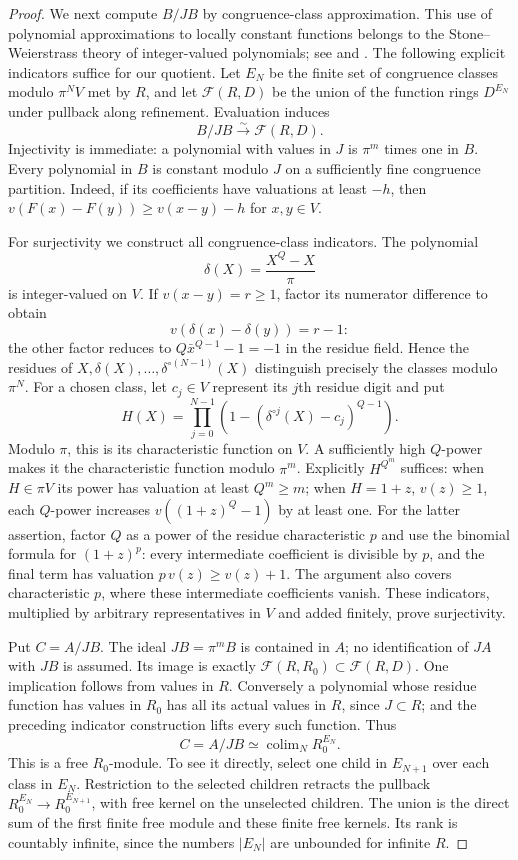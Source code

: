 \documentclass[11pt,a4paper]{article}
\theoremstyle{definition}
\begin{document}
\begin{proof}
We next compute $B/JB$ by congruence-class approximation. This
use of polynomial approximations to locally constant functions
belongs to the Stone--Weierstrass theory of integer-valued
polynomials; see \cite[\S4, pp.~52--53]{CahenGrazziniHaouat1982}
and \cite[Proposition~4.3, author version pp.~18--19]{CahenChabert1999Skolem}.
The following explicit indicators suffice for our quotient.
Let $E_N$ be the finite set of
congruence classes modulo $\pi^NV$ met by $R$, and let
$\mathcal F(R,D)$ be the union of the function rings $D^{E_N}$
under pullback along refinement. Evaluation induces
\[
 B/JB\xrightarrow{\sim}\mathcal F(R,D).
\]
Injectivity is immediate: a polynomial with values in $J$ is
$\pi^m$ times one in $B$. Every polynomial in $B$ is constant
modulo $J$ on a sufficiently fine congruence partition. Indeed,
if its coefficients have valuations at least $-h$, then
$v(F(x)-F(y))\ge v(x-y)-h$ for $x,y\in V$.

For surjectivity we construct all congruence-class indicators.
The polynomial
\[
 \delta(X)=\frac{X^Q-X}{\pi}
\]
is integer-valued on $V$. If $v(x-y)=r\ge1$, factor its numerator
difference to obtain
\[
 v(\delta(x)-\delta(y))=r-1:
\]
the other factor reduces to $Q\bar x^{Q-1}-1=-1$ in the residue
field. Hence the residues of
$X,\delta(X),\ldots,\delta^{\circ(N-1)}(X)$ distinguish precisely
the classes modulo $\pi^N$. For a chosen class, let $c_j\in V$
represent its $j$th residue digit and put
\[
 H(X)=\prod_{j=0}^{N-1}
       \left(1-(\delta^{\circ j}(X)-c_j)^{Q-1}\right).
\]
Modulo $\pi$, this is its characteristic function on $V$.
A sufficiently high $Q$-power makes it the characteristic function
modulo $\pi^m$. Explicitly $H^{Q^m}$ suffices: when $H\in\pi V$
its power has valuation at least $Q^m\ge m$; when $H=1+z$,
$v(z)\ge1$, each $Q$-power increases $v((1+z)^Q-1)$ by at least
one. For the latter assertion, factor $Q$ as a power of the
residue characteristic $p$ and use the binomial formula for
$(1+z)^p$: every intermediate coefficient is divisible by $p$,
and the final term has valuation $p\,v(z)\ge v(z)+1$.
The argument also covers characteristic $p$, where these
intermediate coefficients vanish. These indicators, multiplied
by arbitrary representatives in $V$ and added finitely, prove
surjectivity.

Put $C=A/JB$. The ideal $JB=\pi^mB$ is contained in $A$; no
identification of $JA$ with $JB$ is assumed.
Its image is exactly $\mathcal F(R,R_0)\subset\mathcal F(R,D)$.
One implication follows from values in $R$. Conversely a
polynomial whose residue function has values in $R_0$ has all
its actual values in $R$, since $J\subset R$; and the preceding
indicator construction lifts every such function. Thus
\[
 C=A/JB\simeq\mathop{\mathrm{colim}}_N R_0^{E_N}.
\]
This is a free $R_0$-module. To see it directly, select one child
in $E_{N+1}$ over each class in $E_N$. Restriction to the selected
children retracts the pullback
$R_0^{E_N}\to R_0^{E_{N+1}}$, with free kernel on the unselected
children. The union is the direct sum of the first finite free
module and these finite free kernels. Its rank is countably
infinite, since the numbers $|E_N|$ are unbounded for infinite $R$.


\end{proof}
\end{document}
